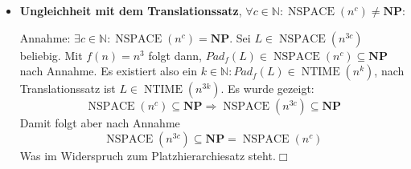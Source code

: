 \documentclass[landscape, 8pt, a4paper]{extarticle}
\newcommand{\npoly}{\textbf{NP}}
\newcommand{\N}{\mathbb{N}}
\begin{document}
\begin{multicols}{3}
\begin{itemize}
		\item \textbf{Ungleichheit mit dem Translationssatz}, $\forall c\in\N: \operatorname{NSPACE}(n^c)\neq \npoly$:

		Annahme: $\exists c\in\N: \operatorname{NSPACE}(n^c)=\npoly$. Sei $L\in\operatorname{NSPACE}(n^{3c})$ beliebig. Mit $f(n)=n^3$ folgt dann, $Pad_f(L)\in\operatorname{NSPACE}(n^c)\subseteq\npoly$ nach Annahme. Es existiert also ein $k\in\N: Pad_f(L)\in\operatorname{NTIME}(n^k)$, nach Translationssatz ist $L\in \operatorname{NTIME}(n^{3k})$. Es wurde gezeigt:
		\begin{equation*}
			\operatorname{NSPACE}(n^c)\subseteq\npoly\Rightarrow\operatorname{NSPACE}(n^{3c})\subseteq\npoly
		\end{equation*}
		Damit folgt aber nach Annahme
		\begin{equation*}
			\operatorname{NSPACE}(n^{3c})\subseteq\npoly =\operatorname{NSPACE}(n^c)
		\end{equation*}
		Was im Widerspruch zum Platzhierarchiesatz steht.\hfill$\Box$
	\end{itemize}

\end{multicols}
\end{document}
